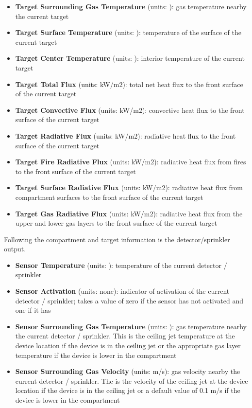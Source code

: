 \begin{itemize}
\item \textbf{Target Surrounding Gas Temperature} (units: \degc): gas temperature nearby the current target
\item \textbf{Target Surface Temperature} (units: \degc): temperature of the surface of the current target
\item \textbf{Target Center Temperature} (units: \degc): interior temperature of the current target
\item \textbf{Target Total Flux} (units: kW/m$2$): total net heat flux to the front surface of the current target
\item \textbf{Target Convective Flux} (units: kW/m$2$): convective heat flux to the  front surface of the current target
\item \textbf{Target Radiative Flux} (units: kW/m$2$): radiative heat flux to the front surface of the current target
\item \textbf{Target Fire Radiative Flux} (units: kW/m$2$): radiative heat flux from fires to the front surface of the current target
\item \textbf{Target Surface Radiative Flux} (units: kW/m$2$): radiative heat flux from compartment surfaces to the front surface of the current target
\item \textbf{Target Gas Radiative Flux} (units: kW/m$2$):   radiative heat flux from the upper and lower gas layers to the front surface of the current target
\end{itemize}

Following the compartment and target information is the detector/sprinkler output.

\begin{itemize}
\item \textbf{Sensor Temperature} (units: \degc): temperature of the current detector / sprinkler
\item \textbf{Sensor Activation} (units: none): indicator of activation of the current detector / sprinkler; takes a value of zero if the sensor has not activated and one if it has
\item \textbf{Sensor Surrounding Gas Temperature} (units: \degc): gas temperature nearby the current detector / sprinkler. This is the ceiling jet temperature at the device location if the device is in the ceiling jet or the appropriate gas layer temperature if the device is lower in the compartment
\item \textbf{Sensor Surrounding Gas Velocity} (units: m/s): gas velocity nearby the current detector / sprinkler. The is the velocity of the ceiling jet at the device location if the device is in the ceiling jet or a default value of 0.1 m/s if the device is lower in the compartment
\end{itemize}

